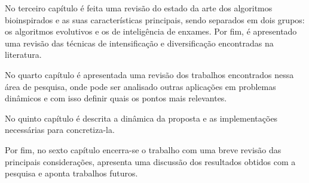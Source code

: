 No terceiro capítulo é feita uma revisão do estado da arte dos algoritmos bioinspirados e as suas características principais, sendo separados em dois grupos: os algoritmos evolutivos e os de inteligência de enxames. Por fim, é apresentado uma revisão das técnicas de intensificação e diversificação encontradas na literatura.

No quarto capítulo é apresentada uma revisão dos trabalhos encontrados nessa área de pesquisa, onde pode ser analisado outras aplicações em problemas dinâmicos e com isso definir quais os pontos mais relevantes.

No quinto capítulo é descrita a dinâmica da proposta e as implementações necessárias para concretiza-la.

Por fim, no sexto capítulo encerra-se o trabalho com uma breve revisão das principais considerações, apresenta uma discussão dos resultados obtidos com a pesquisa e aponta trabalhos futuros.
